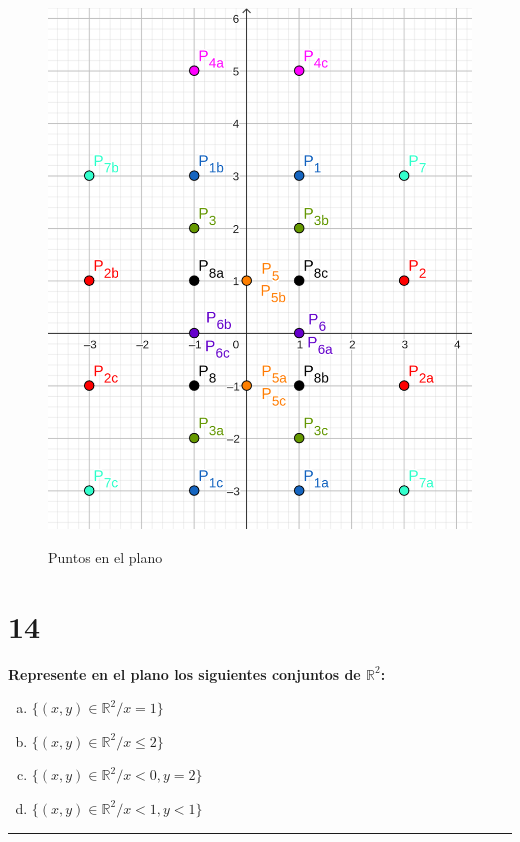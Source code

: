 \documentclass{article}
\begin{document}
\begin{figure}[ht]
\caption{Puntos en el plano}
\includegraphics[scale=1]{../../common/sb_28/ex_00/ex_13.png} 
\centering
\label{fig:13}
\end{figure}

\section*{14}
\label{sec:14}

\textbf{Represente en el plano los siguientes conjuntos de $\mathbb{R}^2$:}

\begin{enumerate}[(a)]
\bfseries

\item $ \{ (x, y) \in \mathbb{R}^2 / x = 1 \} $

\item $ \{ (x, y) \in \mathbb{R}^2 / x \leq 2 \} $

\item $ \{ (x, y) \in \mathbb{R}^2 / x < 0, y = 2 \} $

\item $ \{ (x, y) \in \mathbb{R}^2 / x < 1, y < 1 \} $

\end{enumerate}
\hrule
\end{document}
